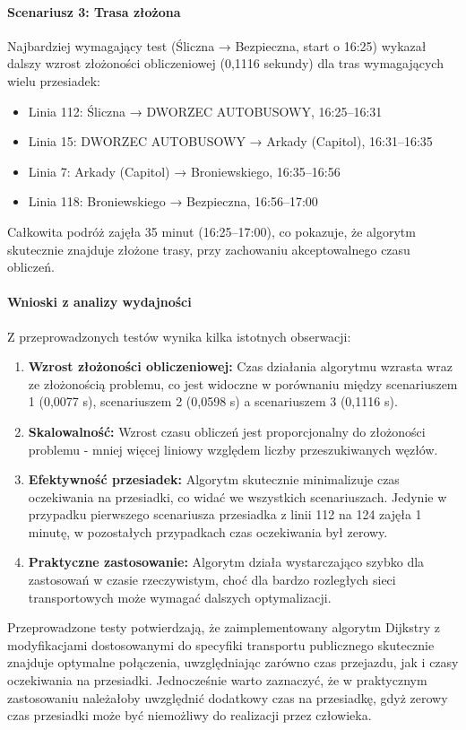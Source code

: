 \documentclass[12pt,a4paper]{article}
\begin{document}
\paragraph{Scenariusz 3: Trasa złożona}
Najbardziej wymagający test (Śliczna → Bezpieczna, start o 16:25) wykazał dalszy wzrost złożoności obliczeniowej (0,1116 sekundy) dla tras wymagających wielu przesiadek:
\begin{itemize}
    \item Linia 112: Śliczna → DWORZEC AUTOBUSOWY, 16:25--16:31
    \item Linia 15: DWORZEC AUTOBUSOWY → Arkady (Capitol), 16:31--16:35
    \item Linia 7: Arkady (Capitol) → Broniewskiego, 16:35--16:56
    \item Linia 118: Broniewskiego → Bezpieczna, 16:56--17:00
\end{itemize}
Całkowita podróż zajęła 35 minut (16:25--17:00), co pokazuje, że algorytm skutecznie znajduje złożone trasy, przy zachowaniu akceptowalnego czasu obliczeń.

\paragraph{Wnioski z analizy wydajności}
Z przeprowadzonych testów wynika kilka istotnych obserwacji:
\begin{enumerate}
    \item \textbf{Wzrost złożoności obliczeniowej:} Czas działania algorytmu wzrasta wraz ze złożonością problemu, co jest widoczne w porównaniu między scenariuszem 1 (0,0077 s), scenariuszem 2 (0,0598 s) a scenariuszem 3 (0,1116 s).
    \item \textbf{Skalowalność:} Wzrost czasu obliczeń jest proporcjonalny do złożoności problemu - mniej więcej liniowy względem liczby przeszukiwanych węzłów.
    \item \textbf{Efektywność przesiadek:} Algorytm skutecznie minimalizuje czas oczekiwania na przesiadki, co widać we wszystkich scenariuszach. Jedynie w przypadku pierwszego scenariusza przesiadka z linii 112 na 124 zajęła 1 minutę, w pozostałych przypadkach czas oczekiwania był zerowy.
    \item \textbf{Praktyczne zastosowanie:} Algorytm działa wystarczająco szybko dla zastosowań w czasie rzeczywistym, choć dla bardzo rozległych sieci transportowych może wymagać dalszych optymalizacji.
\end{enumerate}

Przeprowadzone testy potwierdzają, że zaimplementowany algorytm Dijkstry z modyfikacjami dostosowanymi do specyfiki transportu publicznego skutecznie znajduje optymalne połączenia, uwzględniając zarówno czas przejazdu, jak i czasy oczekiwania na przesiadki. Jednocześnie warto zaznaczyć, że w praktycznym zastosowaniu należałoby uwzględnić dodatkowy czas na przesiadkę, gdyż zerowy czas przesiadki może być niemożliwy do realizacji przez człowieka.
\end{document}
